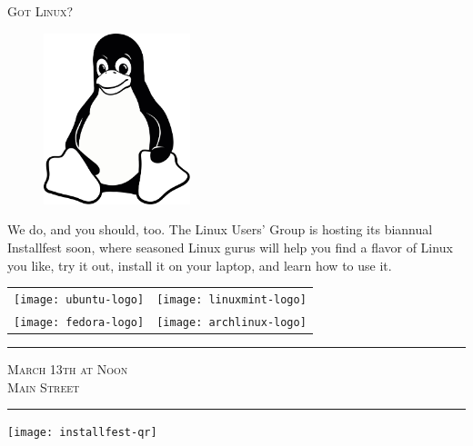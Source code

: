 \documentclass[12pt]{article}
\begin{document}
\pagestyle{empty}

\begin{center} \LARGE \scshape
    Got Linux?
\end{center}

\begin{figure}
    \vspace{-2em} %
    \begin{center}
        \includegraphics[width=0.38\textwidth]{tux-bw}
    \end{center}
    \vspace{-2em} %
\end{figure}

{%

    We do, and you should, too. The Linux Users' Group is hosting its biannual
    Installfest soon, where seasoned Linux gurus will help you find a flavor of
    Linux you like, try it out, install it on your laptop, and learn how to use
    it.

}

\vfill


\begin{tabular}{SS}
    \texttt{[image: ubuntu-logo]} &
    \texttt{[image: linuxmint-logo]} \\
    \texttt{[image: fedora-logo]} &
    \texttt{[image: archlinux-logo]} \\
\end{tabular}

\begin{minipage}[bt]{0.58\textwidth}
    \begin{center}
        \hrule{}
        \vspace{1em}
        {\large \scshape
            March 13th at Noon\\
            Main Street
        }
        \vspace{1em}
        \hrule{}
    \end{center}
\end{minipage}
\begin{minipage}[bt]{0.38\textwidth}
    \begin{center}
        \texttt{[image: installfest-qr]}
    \end{center}
\end{minipage}
\end{document}
